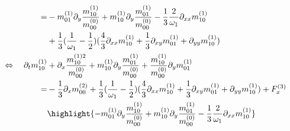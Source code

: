 \documentclass{article}
\begin{document}
\begin{align*}
    \\ = &
    - m_{01}^{(1)}\partial_y \frac{ m_{10}^{(1)}}{m_{00}^{(0)}}
    + m_{10}^{(1)}\partial_y \frac{ m_{01}^{(1)}}{m_{00}^{(0)}}
    - \frac{1}{3}\frac{2}{\omega_1} \partial_{xx} m_{10}^{(1)}
    \\ &
    + \frac{1}{3}(\frac{1}{\omega_1} - \frac{1}{2}) (\frac{4}{3}\partial_{xx} m_{10}^{(1)} + \frac{1}{3}\partial_{xy} m_{01}^{(1)}  + \partial_{yy} m_{10}^{(1)})
    \\\Leftrightarrow\quad   \partial_t m_{10}^{(1)} &
    + \partial_x \frac{ m_{10}^{(1)2}}{ m_{00}^{(0)}}
    + m_{10}^{(1)}\partial_y \frac{ m_{01}^{(1)}}{m_{00}^{(0)}}
    + \frac{ m_{10}^{(1)}}{m_{00}^{(0)}}\partial_y m_{01}^{(1)}
    \\ = &
    - \frac{1}{3}\partial_x m_{00}^{(2)}
    + \frac{1}{3}(\frac{1}{\omega_1} - \frac{1}{2}) (\frac{4}{3}\partial_{xx} m_{10}^{(1)} + \frac{1}{3}\partial_{xy} m_{01}^{(1)}  + \partial_{yy} m_{10}^{(1)})
    + F_x^{(3)}
    \\ &
    \highlight{
    - m_{01}^{(1)}\partial_y \frac{ m_{10}^{(1)}}{m_{00}^{(0)}}
    + m_{10}^{(1)}\partial_y \frac{ m_{01}^{(1)}}{m_{00}^{(0)}}
    - \frac{1}{3}\frac{2}{\omega_1} \partial_{xx} m_{10}^{(1)}
    }
\end{align*}
\end{document}
